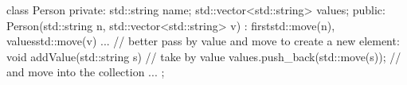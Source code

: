 \begin{cppcode}
class Person {
private:
	std::string name;
	std::vector<std::string> values;
public:
	Person(std::string n, std::vector<std::string> v)
	: first{std::move(n)}, values{std::move(v)} {
	}
	...
	// better pass by value and move to create a new element:
	void addValue(std::string s) { // take by value
		values.push_back(std::move(s)); // and move into the collection
	}
	...
};
\end{cppcode}
























